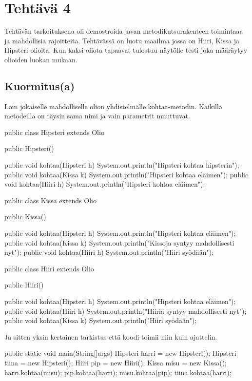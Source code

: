 
\chapter{Tehtävä 4 \label{chap:Teht=0000E4v=0000E4-4}}

Tehtävän tarkoituksena oli demostroida javan metodikutsurakenteen toimintaaa ja mahdollisia rajoitteita.
Tehtävässä on luotu maailma jossa on Hiiri, Kissa ja Hipsteri olioita. Kun kaksi oliota tapaavat tulostuu näytölle testi joka määräytyy olioiden luokan mukaan.

\section{Kuormitus(a)}

\label{Kuormitus}

Loin jokaiselle mahdolliselle olion yhdistelmälle kohtaa-metodin. 
Kaikilla metodeilla on täysin sama nimi ja vain parametrit muuttuvat.

\label{Olio-luokat}
\begin{javacode}
public class Hipsteri extends Olio {
	public Hipsteri() {}
	
	public void kohtaa(Hipsteri h) {
		System.out.println("Hipsteri kohtaa hipsterin");
	}
    public void kohtaa(Kissa k) {
    	System.out.println("Hipsteri kohtaa eläimen");
	}
    public void kohtaa(Hiiri h) {
    	System.out.println("Hipsteri kohtaa eläimen");
	}
}
public class Kissa extends Olio{
	public Kissa() {}
	
	public void kohtaa(Hipsteri h) {
		System.out.println("Hipsteri kohtaa eläimen");
	}
	public void kohtaa(Kissa k) {
		System.out.println("Kissoja syntyy mahdollisesti nyt");
	}
	public void kohtaa(Hiiri h) {
		System.out.println("Hiiri syödään");
	}
}
public class Hiiri extends Olio {
	public Hiiri() {}
	
	public void kohtaa(Hipsteri h) {
		System.out.println("Hipsteri kohtaa eläimen");
	}
	public void kohtaa(Hiiri h) {
		System.out.println("Hiiriä syntyy mahdollisesti nyt");
	}
	public void kohtaa(Kissa k) {
		System.out.println("Hiiri syödään");
	}
}
\end{javacode}
Ja sitten yksin kertainen tarkistus että koodi toimii niin kuin ajattelin.

\label{Koodin testaus}
\begin{javacode}
public static void main(String[]args) {
    	Hipsteri harri = new Hipsteri();
    	Hipsteri tiina = new Hipsteri();
    	Hiiri pip = new Hiiri();
    	Kissa misu = new Kissa();
    	harri.kohtaa(misu);
    	pip.kohtaa(harri);
    	misu.kohtaa(pip);
    	tiina.kohtaa(harri);
      }
\end{javacode}

